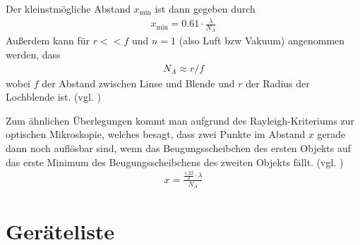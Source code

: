 \documentclass{article}
\begin{document}
Der kleinstmögliche Abstand $x_{\operatorname{min}}$ ist dann gegeben durch
\begin{align}
x_{\text{min}} = 0.61 \cdot \frac{\lambda}{N_A}
\end{align}
Außerdem kann für $r<<f$ und $n=1$ (also Luft bzw Vakuum) angenommen werden, dass
\begin{align}
N_A \approx r/f
\end{align}
wobei $f$ der Abstand zwischen Linse und Blende und $r$ der Radius der Lochblende ist.  (vgl. \cite{quelle1} \cite{quelle2} \cite{quelle3})

Zum ähnlichen Überlegungen kommt man aufgrund des Rayleigh-Kriteriums zur optischen Mikroskopie, welches besagt, dass zwei Punkte im Abstand $x$ gerade dann noch auflösbar sind, wenn das Beugungsscheibchen des ersten Objekts auf das erste Minimum des Beugungsscheibchens des zweiten Objekts fällt. (vgl. \cite{quelle4} \cite{quelle5})
\begin{align}
x = \frac{\frac{1.22}{2}\cdot \lambda}{N_A}
\end{align}






\section{Geräteliste}
\end{document}
